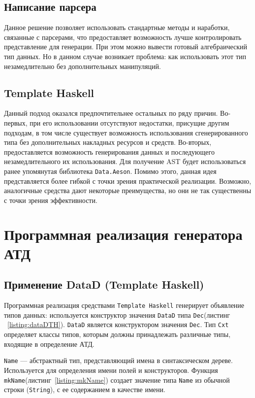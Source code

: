 \subsection{Написание парсера}
Данное решение позволяет использовать стандартные методы и наработки, связанные с парсерами, что предоставляет возможность лучше контролировать представление для генерации. При этом можно вывести готовый алгебраический тип данных. Но в данном случае возникает проблема: как использовать этот тип незамедлительно без дополнительных манипуляций.   	

\subsection{Template Haskell}
Данный подход оказался предпочтительнее остальных по ряду причин. Во-первых, при его использовании отсутствуют недостатки, присущие другим подходам, в том числе существует возможность использования сгенерированного типа без дополнительных накладных ресурсов и средств. Во-вторых, предоставляется возможность генерирования данных  и последующего незамедлительного их использования. Для получение AST будет использоваться ранее упомянутая библиотека \lstinline{Data.Aeson}. Помимо этого, данная идея представляется более гибкой с точки зрения практической реализации. Возможно, аналогичные средства дают некоторые преимущества, но они не так существенны с точки зрения эффективности.

\section{Программная реализация генератора АТД}

\subsection{Применение DataD (Template Haskell)}

Программная реализация средствами \lstinline{Template Haskell} генерирует объявление типов данных: используется конструктор значения \lstinline{DataD} типа \lstinline{Dec}\:(листинг ~\ref{listing:dataDTH}). \lstinline{DataD} является конструктором значения \lstinline{Dec}. Тип \lstinline{Cxt} определяет классы типов, которым должны принадлежать различные типы, входящие в определение АТД.

\lstinline{Name} --- абстрактный тип, представляющий имена в синтаксическом дереве. Используется для определения имени полей и конструкторов. Функция \lstinline{mkName}\:(листинг~\ref{listing:mkName}) создает значение типа \lstinline{Name} из обычной строки (\lstinline{String}), с ее содержанием в качестве имени.

